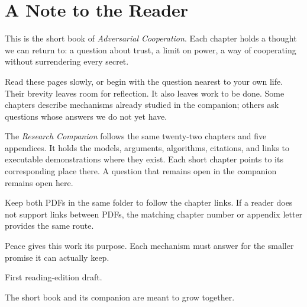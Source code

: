 \raggedright
\chapter*{A Note to the Reader}

This is the short book of \emph{Adversarial Cooperation}. Each chapter holds a
thought we can return to: a question about trust, a limit on power, a way of
cooperating without surrendering every secret.

Read these pages slowly, or begin with the question nearest to your own life.
Their brevity leaves room for reflection. It also leaves work to be done.
Some chapters describe mechanisms already studied in the companion; others
ask questions whose answers we do not yet have.

The \emph{Research Companion} follows the same twenty-two chapters and five
appendices. It holds the models, arguments, algorithms, citations, and links
to executable demonstrations where they exist. Each short chapter points to
its corresponding place there. A question that remains open in the companion
remains open here.

Keep both PDFs in the same folder to follow the chapter links. If a reader
does not support links between PDFs, the matching chapter number or appendix
letter provides the same route.

Peace gives this work its purpose. Each mechanism must answer for the smaller
promise it can actually keep.

\vfill
{\small\color{quiet}First reading-edition draft.\par
The short book and its companion are meant to grow together.}
